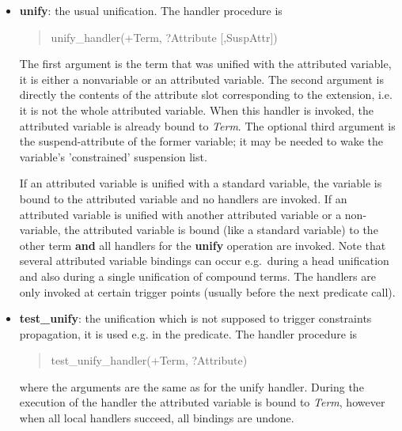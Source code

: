 \begin{itemize}
\item {\bf unify}: the usual unification.
The handler procedure is
\begin{quote}
unify_handler(+Term, ?Attribute [,SuspAttr])
\end{quote}
The first argument is the term that was unified with the attributed variable,
it is either a nonvariable or an attributed variable.
The second argument is directly the contents of the attribute slot
corresponding to the extension, i.e. it is not the whole attributed variable.
When this handler is invoked, the attributed variable is already bound
to {\it Term}.
The optional third argument is the suspend-attribute of the former
variable; it may be needed to wake the variable's 'constrained' suspension
list.

If an attributed variable is unified with a standard variable, the variable is bound
to the attributed variable and no handlers are invoked.
If an attributed variable is unified with another attributed variable or a non-variable,
the attributed variable is bound (like a standard variable) to the other term
{\bf and} all handlers for the {\bf unify} operation are invoked. 
Note that several attributed variable bindings can occur e.g.\ during a head unification
and also during a single unification of compound terms.
The handlers are only invoked at certain trigger points (usually before the
next predicate call).

\item {\bf test_unify}: the unification which is not supposed
to trigger constraints propagation, it is used e.g.
in the 
predicate.
The handler procedure is
\begin{quote}
test_unify_handler(+Term, ?Attribute)
\end{quote}
where the arguments are the same as for the unify handler.
During the execution of the handler the attributed variable is bound
to {\it Term}, however when all local handlers succeed,
all bindings are undone.


\end{itemize}
